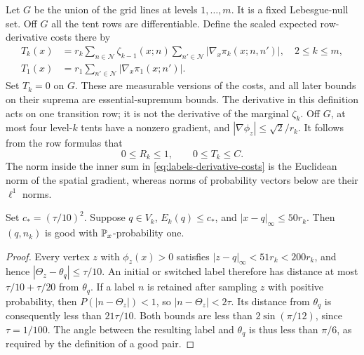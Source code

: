 Let $G$ be the union of the grid lines at levels $1,\ldots,m$.
It is a fixed Lebesgue-null set. Off $G$ all the tent rows are
differentiable. Define the scaled expected row-derivative costs there by
\begin{equation}
 \begin{split}
 T_k(x)&=r_k\sum_{n\in\mathcal N}\zeta_{k-1}(x;n)
          \sum_{n'\in\mathcal N}
             |\nabla_x\pi_k(x;n,n')|,\quad 2\le k\le m,\\
 T_1(x)&=r_1\sum_{n'\in\mathcal N}
                         |\nabla_x\pi_1(x;n')|.
 \end{split}
 \label{eq:labels-derivative-costs}
\end{equation}
Set $T_k=0$ on $G$. These are measurable versions of the costs, and
all later bounds on their suprema are essential-supremum bounds.
The derivative in this definition acts on one transition row; it is
not the derivative of the marginal $\zeta_k$. Off $G$, at most four
level-$k$ tents have a nonzero gradient, and
$|\nabla\phi_z|\le\sqrt2/r_k$. It follows from the row formulas that
\begin{equation}
 0\le R_k\le1,
 \qquad 0\le T_k\le C.
 \label{eq:labels-uniform-costs}
\end{equation}
The norm inside the inner sum in \eqref{eq:labels-derivative-costs} is the
Euclidean norm of the spatial gradient, whereas norms of probability vectors
below are their $\ell^1$ norms.

\begin{lemma}
\label{lem:good-label}
Set $c_*=(\tau/10)^2$. Suppose $q\in V_k$, $E_k(q)\le c_*$, and
$|x-q|_{\infty}\le50r_k$. Then $(q,n_k)$ is good with $\mathbb P_x$-probability
one.
\end{lemma}

\begin{proof}
Every vertex $z$ with $\phi_z(x)>0$ satisfies
$|z-q|_{\infty}<51r_k<200r_k$, and hence
$|\Theta_z-\theta_q|\le\tau/10$. An initial or switched label therefore
has distance at most $\tau/10+\tau/20$ from $\theta_q$. If a label $n$ is
retained after sampling $z$ with positive probability, then
$P(|n-\Theta_z|)<1$, so $|n-\Theta_z|<2\tau$. Its distance from
$\theta_q$ is consequently less than $21\tau/10$.
Both bounds are less than $2\sin(\pi/12)$, since $\tau=1/100$.
The angle between the resulting label and $\theta_q$ is thus less than
$\pi/6$, as required by the definition of a good pair.
\end{proof}

